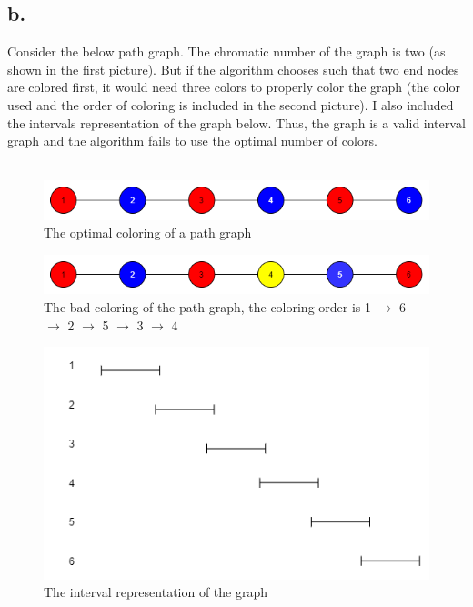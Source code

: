 \documentclass{article}
\begin{document}
\subsection*{b.}
Consider the below path graph. The chromatic number of the graph is two (as shown in the first picture). But if the algorithm chooses such that two end nodes are colored first, it would need three colors to properly color the graph (the color used and the order of coloring is included in the second picture). I also included the intervals representation of the graph below. Thus, the graph is a valid interval graph and the algorithm fails to use the optimal number of colors. \\\\
\begin{figure}[h]
    \centering
    \includegraphics[scale = 0.45]{2b_1}
    \caption{The optimal coloring of a path graph}
\end{figure}
\begin{figure}[h]
    \centering
    \includegraphics[scale = 0.45]{2b_2}
    \caption{The bad coloring of the path graph, the coloring order is 1 $\rightarrow$ 6 $\rightarrow$ 2 $\rightarrow$ 5 $\rightarrow$ 3 $\rightarrow$ 4}
\end{figure}
\begin{figure}[h]
    \centering
    \includegraphics[scale = 0.45]{2b_3}
    \caption{The interval representation of the graph}
\end{figure}
\end{document}
